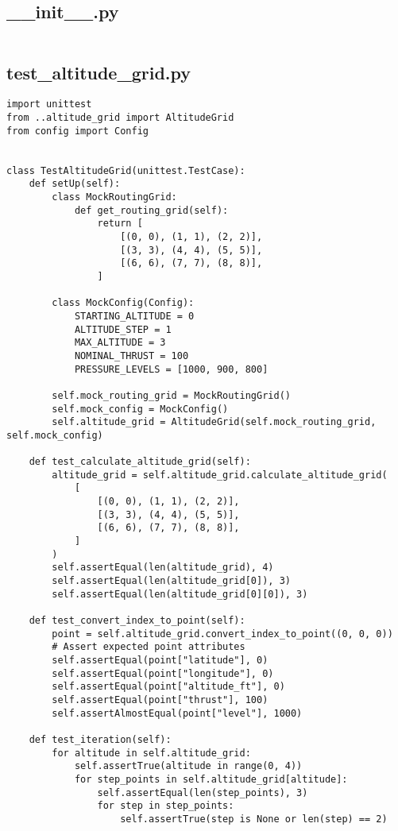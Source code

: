 \subsection{__init__.py}
\begin{verbatim}

\end{verbatim}
\subsection{test_altitude_grid.py}
\begin{verbatim}
import unittest
from ..altitude_grid import AltitudeGrid
from config import Config


class TestAltitudeGrid(unittest.TestCase):
    def setUp(self):
        class MockRoutingGrid:
            def get_routing_grid(self):
                return [
                    [(0, 0), (1, 1), (2, 2)],
                    [(3, 3), (4, 4), (5, 5)],
                    [(6, 6), (7, 7), (8, 8)],
                ]

        class MockConfig(Config):
            STARTING_ALTITUDE = 0
            ALTITUDE_STEP = 1
            MAX_ALTITUDE = 3
            NOMINAL_THRUST = 100
            PRESSURE_LEVELS = [1000, 900, 800]

        self.mock_routing_grid = MockRoutingGrid()
        self.mock_config = MockConfig()
        self.altitude_grid = AltitudeGrid(self.mock_routing_grid, self.mock_config)

    def test_calculate_altitude_grid(self):
        altitude_grid = self.altitude_grid.calculate_altitude_grid(
            [
                [(0, 0), (1, 1), (2, 2)],
                [(3, 3), (4, 4), (5, 5)],
                [(6, 6), (7, 7), (8, 8)],
            ]
        )
        self.assertEqual(len(altitude_grid), 4)
        self.assertEqual(len(altitude_grid[0]), 3)
        self.assertEqual(len(altitude_grid[0][0]), 3)

    def test_convert_index_to_point(self):
        point = self.altitude_grid.convert_index_to_point((0, 0, 0))
        # Assert expected point attributes
        self.assertEqual(point["latitude"], 0)
        self.assertEqual(point["longitude"], 0)
        self.assertEqual(point["altitude_ft"], 0)
        self.assertEqual(point["thrust"], 100)
        self.assertAlmostEqual(point["level"], 1000)

    def test_iteration(self):
        for altitude in self.altitude_grid:
            self.assertTrue(altitude in range(0, 4))
            for step_points in self.altitude_grid[altitude]:
                self.assertEqual(len(step_points), 3)
                for step in step_points:
                    self.assertTrue(step is None or len(step) == 2)


\end{verbatim}
